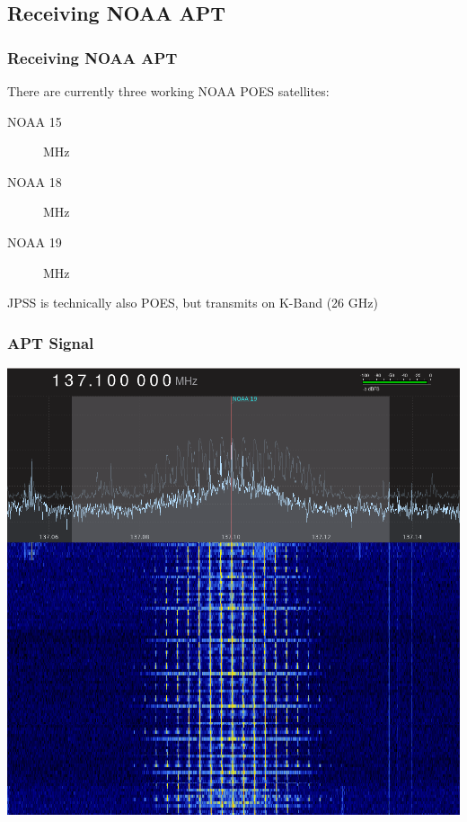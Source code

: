 \documentclass[]{beamer}
\begin{document}
\subsection{Receiving NOAA APT}
\begin{frame}
    \frametitle{Receiving NOAA APT}
    There are currently three working NOAA POES satellites:
    \begin{description}
        \item[NOAA 15]  MHz
        \item[NOAA 18]  MHz
        \item[NOAA 19]  MHz
    \end{description}
    {\scriptsize JPSS is technically also POES, but transmits on K-Band (26 GHz)}
\end{frame}
\begin{frame}
    \frametitle{APT Signal}
    \begin{center}
        \includegraphics[width=0.75\paperwidth,height=0.75\paperheight,keepaspectratio]{images/apt-gqrx.png}
    \end{center}
\end{frame}
\end{document}
